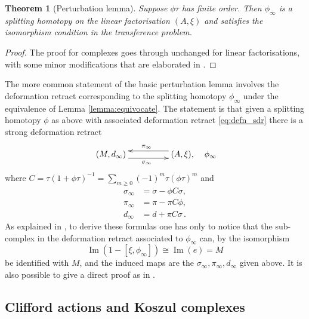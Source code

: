 \documentclass[english,letter paper,12pt,leqno]{article}
\newtheorem{theorem}{Theorem}[section]
\theoremstyle{example}
\numberwithin{equation}{section}
\def\im{\operatorname{Im}}
\begin{document}
\begin{theorem}[Perturbation lemma]\label{theorem:pertlemma} Suppose $\phi \tau$ has finite order. Then $\phi_\infty$ is a splitting homotopy on the linear factorisation $(A, \xi)$ and satisfies the isomorphism condition in the transference problem.
\end{theorem}
\begin{proof}
The proof for complexes \cite[p.886]{barneslambe} goes through unchanged for linear factorisations, with some minor modifications that are elaborated in \cite[\S 2.5]{lgdual}.
\end{proof}

The more common statement of the basic perturbation lemma involves the deformation retract corresponding to the splitting homotopy $\phi_\infty$ under the equivalence of Lemma \ref{lemma:equivocate}. The statement is that given a splitting homotopy $\phi$ as above with associated deformation retract \eqref{eq:defn_sdr} there is a strong deformation retract
\begin{equation}\label{eq:perturbedsdr}
\xymatrix@C+2pc{
(M,d_\infty) \ar@<-1ex>[r]_{\sigma_\infty} & (A, \xi), \ar@<-1ex>[l]_{\pi_\infty}
} \quad \phi_\infty
\end{equation}
where $C = \tau( 1 + \phi \tau )^{-1} = \sum_{m \ge 0} (-1)^m \tau (\phi \tau)^m$ and
\begin{align*}
\sigma_\infty &= \sigma - \phi C \sigma,\\
\pi_\infty &= \pi - \pi C \phi,\\
d_\infty &= d + \pi C \sigma\,.
\end{align*}
As explained in \cite{barneslambe}, to derive these formulas one has only to notice that the sub-complex in the deformation retract associated to $\phi_\infty$ can, by the isomorphism
\[
\im(1 - [\xi, \phi_\infty]) \cong \im(e) = M
\]
be identified with $M$, and the induced maps are the $\sigma_\infty, \pi_\infty, d_\infty$ given above. It is also possible to give a direct proof as in \cite{crainic}. %

\subsection{Clifford actions and Koszul complexes}\label{section:cliffordactkos}
\end{document}
